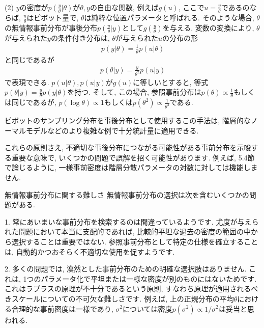 \documentclass[10pt,dvipdfmx,a4]{beamer}
\newcommand{\eqn}[1]{\begin{align*}#1\end{align*}}
\begin{document}
\begin{frame}
(2) $y$の密度が$p(\tfrac{y}{\theta}|\theta)$が$\theta, y$の自由な関数, 例えば$g(u)$, ここで$u=\tfrac{y}{\theta}$であるのならば, $\tfrac{y}{\theta}$はピボット量で, $\theta$は純粋な位置パラメータと呼ばれる.
そのような場合, $\theta$の無情報事前分布が事後分布$p(\tfrac{y}{\theta}|y)$として$g(\tfrac{y}{\theta})$を与える.
変数の変換により, $\theta$が与えられた$y$の条件付き分布は, $\theta$が与えられた$u$の分布の形
\eqn{p(y|\theta)=\frac{1}{\theta}p(u|\theta)}
と同じであるが
\eqn{p(\theta|y)=\frac{y}{\theta^2}p(u|y)}
で表現できる.
$p(u|\theta), p(u|y)$が$g(u)$に等しいとすると, 等式$p(\theta|y)=\tfrac{y}{\theta}p(y|\theta)$を持つ.
そして, この場合, 参照事前分布は$p(\theta)\propto\tfrac{1}{\theta}$もしくは同じであるが, $p(\log \theta)\propto 1$もしくは$p(\theta^2)\propto\tfrac{1}{\theta^2}$である.

ピボットのサンプリング分布を事後分布として使用するこの手法は, 階層的なノーマルモデルなどのより複雑な例で十分統計量に適用できる.

これらの原則さえ, 不適切な事後分布につながる可能性がある事前分布を示唆する重要な意味で, いくつかの問題で誤解を招く可能性があります.
例えば, 5.4節で論じるように, 一様事前密度は階層分散パラメータの対数に対しては機能しません.
\end{frame}


\begin{frame}{無情報事前分布に関する難しさ}
無情報事前分布の選択は次を含むいくつかの問題がある.

1. 常にあいまいな事前分布を検索するのは間違っているようです.
尤度が与えられた問題において本当に支配的であれば, 比較的平坦な過去の密度の範囲の中から選択することは重要ではない.
参照事前分布として特定の仕様を確立することは, 自動的かつおそらく不適切な使用を促すようです.

2. 多くの問題では, 漠然とした事前分布のための明確な選択肢はありません.
これは, 1つのパラメータ化で平坦または一様な密度が別のものにはないためです.
これはラプラスの原理が不十分であるという原則, すなわち原理が適用されるべきスケールについての不可欠な難しさです.
例えば, 上の正規分布の平均$\theta$における合理的な事前密度は一様であり, $\sigma^2$については密度$p(\sigma^2)\propto1/\sigma^2$は妥当と思われる.
\end{frame}

\end{document}
